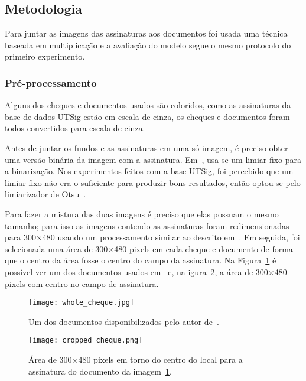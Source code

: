 \documentclass[11pt, twocolumn, a4paper]{article}
\begin{document}
\subsection{Metodologia}

Para juntar as imagens das assinaturas aos documentos foi usada uma técnica baseada em multiplicação e a avaliação do modelo segue o mesmo protocolo do primeiro experimento.

\subsubsection{Pré-processamento}

Alguns dos cheques e documentos usados são coloridos, como as assinaturas da base de dados UTSig estão em escala de cinza, os cheques e documentos foram todos convertidos para escala de cinza.

Antes de juntar os fundos e as assinaturas em uma só imagem, é preciso obter uma versão binária da imagem com a assinatura. Em~\cite{checks paper}, usa-se um limiar fixo para a binarização. Nos experimentos feitos com a base UTSig, foi percebido que um limiar fixo não era o suficiente para produzir bons resultados, então optou-se pelo limiarizador de Otsu~\cite{otsu1985}.

Para fazer a mistura das duas imagens é preciso que elas possuam o mesmo tamanho; para isso as imagens contendo as assinaturas foram redimensionadas para 300$\times$480 usando um processamento similar ao descrito em~\cite{hafemann2}. Em seguida, foi selecionada uma área de 300$\times$480 pixels em cada cheque e documento de forma que o centro da área fosse o centro do campo da assinatura. Na Figura~\ref{whole-cheque} é possível ver um dos documentos usados em~\cite{checks paper} e, na igura~\ref{cropped-cheque}, a área de 300$\times$480 pixels com centro no campo de assinatura.

\begin{figure}[!htb]
\centering
\texttt{[image: whole\_cheque.jpg]}
\caption{Um dos documentos disponibilizados pelo autor de~\cite{checks paper}.}
\label{whole-cheque}
\end{figure}

\begin{figure}[!htb]
\centering
\texttt{[image: cropped\_cheque.png]}
\caption{Área de 300$\times$480 pixels em torno do centro do local para a assinatura do documento da imagem~\ref{whole-cheque}.}
\label{cropped-cheque}
\end{figure}
\end{document}
